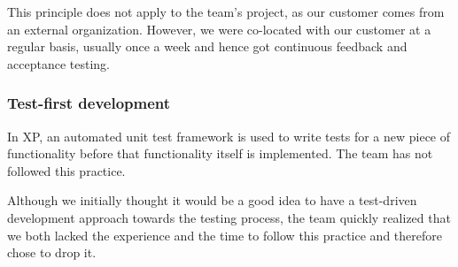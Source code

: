 This principle does not apply to the team's project, as our customer comes from an external organization. However, we were co-located with our customer at a regular basis, usually once a week and hence got continuous feedback and acceptance testing.

\subsubsection{Test-first development}
In XP, an automated unit test framework is used to write tests for a new piece of functionality before that functionality itself is implemented. The team has not followed this practice.

Although we initially thought it would be a good idea to have a test-driven development approach towards the testing process, the team quickly realized that we both lacked the experience and the time to follow this practice and therefore chose to drop it.